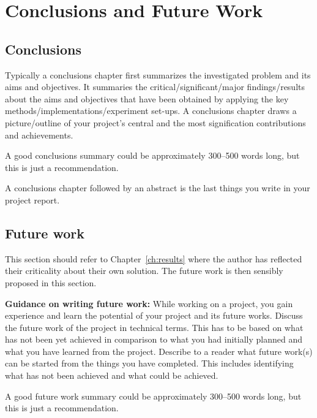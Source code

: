 \chapter{Conclusions and Future Work}
\label{ch:con}
\section{Conclusions}
Typically a conclusions chapter first summarizes the investigated problem and its aims and objectives. It summaries the critical/significant/major findings/results about the aims and objectives that have been obtained by applying the key methods/implementations/experiment set-ups. A conclusions chapter draws a picture/outline of your project's central and the most signification contributions and achievements. 

A good conclusions summary could be approximately 300--500 words long, but this is just a recommendation.

A conclusions chapter followed by an abstract is the last things you write in your project report.

\section{Future work}
This section should refer to Chapter~\ref{ch:results} where the author has reflected their criticality about their own solution. The future work is then sensibly proposed in this section.

\textbf{Guidance on writing future work:} While working on a project, you gain experience and learn the potential of your project and its future works. Discuss the future work of the project in technical terms. This has to be based on what has not been yet achieved in comparison to what you had initially planned and what you have learned from the project. Describe to a reader what future work(s) can be started from the things you have completed. This includes identifying what has not been achieved and what could be achieved. 



A good future work summary could be approximately 300--500 words long, but this is just a recommendation.